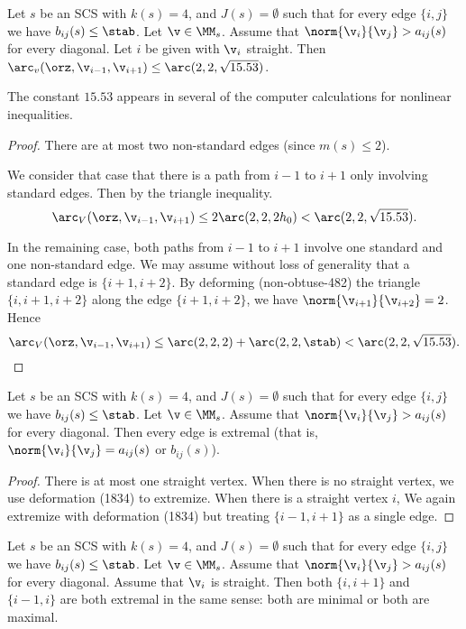 \begin{lemma}[]\label{lemma:15.53}
Let $s$ be an SCS with $k(s)=4$, and $J(s)=\emptyset$
such that for every edge $\{i,j\}$ we have $b_{ij}(s)\le\stab$.
Let $\v\in \MM_s$.  
Assume that $\norm{\v_i}{\v_j}> a_{ij}(s)$ for every diagonal.
Let  $i$ be given with $\v_i$ straight.
Then $\arc_v(\orz,{\v_{i-1}},{\v_{i+1}}) \le \arc(2,2,\sqrt{15.53}) $.
\end{lemma}

\begin{remark} The constant $15.53$ appears in several of the computer calculations for
nonlinear inequalities.
\end{remark}

\begin{proof}  
There are at most two non-standard edges (since $m(s)\le 2$).  

We consider that case that there is a path from $i-1$ to $i+1$ only involving standard edges.
Then by the triangle inequality.
\[
\arc_V(\orz,{\v_{i-1}},{\v_{i+1}}) \le 2\arc(2,2,2h_0)<\arc(2,2,\sqrt{15.53}).
\]

In the remaining case, both paths from $i-1$ to $i+1$ involve one standard and one non-standard edge.
We may assume without loss of generality that a standard edge is $\{i+1,i+2\}$.
By deforming (non-obtuse-482) the triangle $\{i,i+1,i+2\}$ along the edge $\{i+1,i+2\}$, we have
$\norm{\v_{i+1}}{\v_{i+2}} = 2$.
Hence 
\[
\arc_V(\orz,{\v_{i-1}},{\v_{i+1}}) \le \arc(2,2,2) + \arc(2,2,\stab) <\arc(2,2,\sqrt{15.53}).
\]
\end{proof}

\begin{lemma}[]
Let $s$ be an SCS with $k(s)=4$, and $J(s)=\emptyset$
such that for every edge $\{i,j\}$ we have $b_{ij}(s)\le\stab$.
Let $\v\in \MM_s$.  
Assume that $\norm{\v_i}{\v_j}> a_{ij}(s)$ for every diagonal.
Then every edge is extremal (that is, $\norm{\v_i}{\v_j} = a_{ij}(s)$ or $b_{ij}(s)$).
\end{lemma}


\begin{proof}
There is at most one straight vertex.
When there is no straight vertex, we use deformation (1834)  to extremize.  When there is a straight vertex $i$,
We again extremize with deformation (1834) but treating $\{i-1,i+1\}$ as a single edge.
\end{proof}

\begin{lemma}[]
Let $s$ be an SCS with $k(s)=4$, and $J(s)=\emptyset$
such that for every edge $\{i,j\}$ we have $b_{ij}(s)\le\stab$.
Let $\v\in \MM_s$.  
Assume that $\norm{\v_i}{\v_j}> a_{ij}(s)$ for every diagonal.
Assume that $\v_i$ is straight.
Then both $\{i,i+1\}$ and $\{i-1,i\}$ are both extremal in the same sense: both are minimal
or both are maximal.
\end{lemma}


